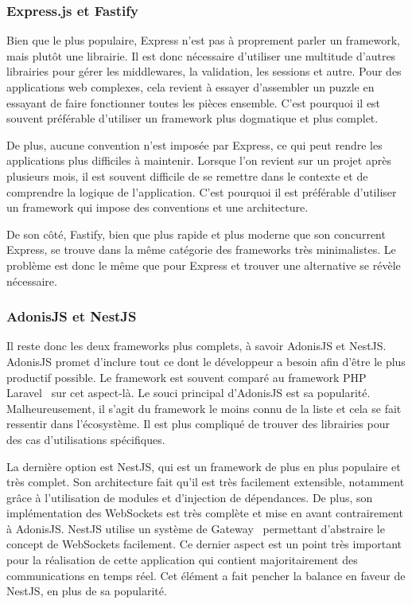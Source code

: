 \subsubsection{Express.js et Fastify}

Bien que le plus populaire, Express n'est pas à proprement parler un framework, mais plutôt une librairie. Il est donc nécessaire d'utiliser une multitude d'autres librairies pour gérer les middlewares, la validation, les sessions et autre. Pour des applications web complexes, cela revient à essayer d'assembler un puzzle en essayant de faire fonctionner toutes les pièces ensemble. C'est pourquoi il est souvent préférable d'utiliser un framework plus dogmatique et plus complet.

De plus, aucune convention n'est imposée par Express, ce qui peut rendre les applications plus difficiles à maintenir. Lorsque l'on revient sur un projet après plusieurs mois, il est souvent difficile de se remettre dans le contexte et de comprendre la logique de l'application. C'est pourquoi il est préférable d'utiliser un framework qui impose des conventions et une architecture.

De son côté, Fastify, bien que plus rapide et plus moderne que son concurrent Express, se trouve dans la même catégorie des frameworks très minimalistes. Le problème est donc le même que pour Express et trouver une alternative se révèle nécessaire.

\subsubsection{AdonisJS et NestJS}

Il reste donc les deux frameworks plus complets, à savoir AdonisJS et NestJS. AdonisJS promet d'inclure tout ce dont le développeur a besoin afin d'être le plus productif possible. Le framework est souvent comparé au framework PHP Laravel~\cite{laravel} sur cet aspect-là. Le souci principal d'AdonisJS est sa popularité. Malheureusement, il s'agit du framework le moins connu de la liste et cela se fait ressentir dans l'écosystème. Il est plus compliqué de trouver des librairies pour des cas d'utilisations spécifiques.

La dernière option est NestJS, qui est un framework de plus en plus populaire et très complet. Son architecture fait qu'il est très facilement extensible, notamment grâce à l'utilisation de modules et d'injection de dépendances. De plus, son implémentation des WebSockets est très complète et mise en avant contrairement à AdonisJS. NestJS utilise un système de Gateway~\cite{nestjs-gateway} permettant d'abstraire le concept de WebSockets facilement.  Ce dernier aspect est un point très important pour la réalisation de cette application qui contient majoritairement des communications en temps réel. Cet élément a fait pencher la balance en faveur de NestJS, en plus de sa popularité.

